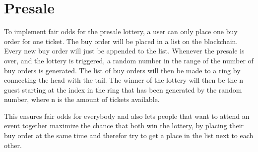 \section{Presale}\label{section:imp:presale}

To implement fair odds for the presale lottery, a user can only place one buy order for one ticket. The buy order will be placed in a list on the blockchain. Every new buy order will just be appended to the list. Whenever the presale is over, and the lottery is triggered, a random number in the range of the number of buy orders is generated. The list of buy orders will then be made to a ring by connecting the head with the tail. The winner of the lottery will then be the n guest starting at the index in the ring that has been generated by the random number, where n is the amount of tickets available. 

This ensures fair odds for everybody and also lets people that want to attend an event together maximize the chance that both win the lottery, by placing their buy order at the same time and therefor try to get a place in the list next to each other.